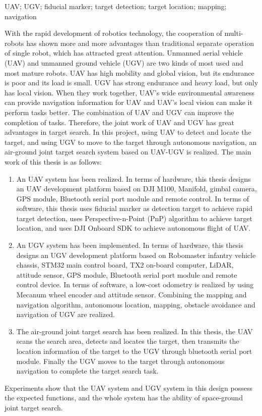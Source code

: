 \begin{enabstract}{UAV; UGV; fiducial marker; target detection; target location; mapping; navigation}
	
With the rapid development of robotics technology, the cooperation of multi-robots has shown more and more advantages than traditional separate operation of single robot, which has attracted great attention. Unmanned aerial vehicle (UAV) and unmanned ground vehicle (UGV) are two kinds of most used and most mature robots. UAV has high mobility and global vision, but its endurance is poor and its load is small. UGV has strong endurance and heavy load, but only has local vision. When they work together, UAV's wide environmental awareness can provide navigation information for UAV and UAV's local vision can make it perform tasks better. The combination of UAV and UGV can improve the completion of tasks. Therefore, the joint work of UAV and UGV has great advantages in target search. In this project, using UAV to detect and locate the target, and using UGV to move to the target through autonomous navigation, an air-ground joint target search system based on UAV-UGV is realized. The main work of this thesis is as follows:

\begin{enumerate}[label=(\arabic*)] 
	\item An UAV system has been realized. In terms of hardware, this thesis designs an UAV development platform based on DJI M100, Manifold, gimbal camera, GPS module, Bluetooth serial port module and remote control. In terms of software, this thesis uses fiducial marker as detection target to achieve rapid target detection, uses Perspective-n-Point (PnP) algorithm to achieve target location, and uses DJI Onboard SDK to achieve autonomous flight of UAV.
	\item An UGV system has been implemented. In terms of hardware, this thesis designs an UGV development platform based on Robomaster infantry vehicle chassis, STM32 main control board, TX2 on-board computer, LiDAR, attitude sensor, GPS module, Bluetooth serial port module and remote control device. In terms of software, a low-cost odometry is realized by using Mecanum wheel encoder and attitude sensor. Combining the mapping and navigation algorithm, autonomous location, mapping, obstacle avoidance and navigation of UGV are realized.
	\item The air-ground joint target search has been realized. In this thesis, the UAV scans the search area, detects and locates the target, then transmits the location information of the target to the UGV through bluetooth serial port module. Finally the UGV moves to the target through autonomous navigation to complete the target search task. 
\end{enumerate}

Experiments show that the UAV system and UGV system in this design possess the expected functions, and the whole system has the ability of space-ground joint target search.

\end{enabstract}
